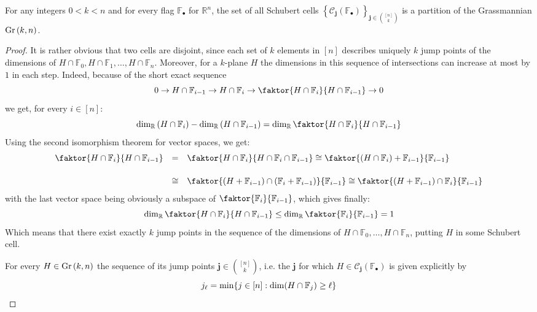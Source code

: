\begin{lemma}\label{lem:jump_pts} For any integers $0<k<n$ and for every flag $\mathbb{F}_{\bullet}$ for $\mathbb{R}^n$, the set of all Schubert cells ${\left\{\mathcal{C}_{\mathbf{j}}(\mathbb{F}_{\bullet})\right\}}_{\mathbf{j}\in\binom{[n]}{k}}$ is a partition of the Grassmannian $\Gr{k}{n}$.
\end{lemma}
\begin{proof} It is rather obvious that two cells are disjoint, since each set of $k$ elements in $[n]$ describes uniquely $k$ jump points of the dimensions of $H\cap\mathbb{F}_0,H\cap\mathbb{F}_1,\ldots,H\cap\mathbb{F}_n$. Moreover, for a $k$-plane $H$ the dimensions in this sequence of intersections can increase at most by $1$ in each step. Indeed, because of the short exact sequence
\[0\to H\cap\mathbb{F}_{i-1}\to H\cap\mathbb{F}_i\to\faktor{H\cap\mathbb{F}_i}{H\cap\mathbb{F}_{i-1}}\to0\]
we get, for every $i\in[n]$:
\[\dim_{\mathbb{R}}\left(H\cap\mathbb{F}_i\right)-\dim_{\mathbb{R}}\left(H\cap\mathbb{F}_{i-1}\right)=\dim_{\mathbb{R}}\faktor{H\cap\mathbb{F}_i}{H\cap\mathbb{F}_{i-1}}\]
Using the second isomorphism theorem for vector spaces, we get:
\[\begin{array}{>{\displaystyle}r>{\displaystyle}c>{\displaystyle}l}\faktor{H\cap\mathbb{F}_i}{H\cap\mathbb{F}_{i-1}}
&=&\faktor{H\cap\mathbb{F}_i}{H\cap\mathbb{F}_i\cap\mathbb{F}_{i-1}}\cong\faktor{(H\cap\mathbb{F}_i)+\mathbb{F}_{i-1}}{\mathbb{F}_{i-1}}\\[1.5em]
&\cong&\faktor{(H+\mathbb{F}_{i-1})\cap(\mathbb{F}_i+\mathbb{F}_{i-1})}{\mathbb{F}_{i-1}}\cong\faktor{(H+\mathbb{F}_{i-1})\cap\mathbb{F}_i}{\mathbb{F}_{i-1}}\\
\end{array}\]
with the last vector space being obviously a subspace of $\faktor{\mathbb{F}_i}{\mathbb{F}_{i-1}}$, which gives finally:
\[\dim_{\mathbb{R}}\faktor{H\cap\mathbb{F}_i}{H\cap\mathbb{F}_{i-1}}\leq\dim_{\mathbb{R}}\faktor{\mathbb{F}_i}{\mathbb{F}_{i-1}}=1\]
Which means that there exist exactly $k$ jump points in the sequence of the dimensions of $H\cap\mathbb{F}_0,\ldots,H\cap\mathbb{F}_n$, putting $H$ in some Schubert cell.

For every $H\in\Gr{k}{n}$ the sequence of its jump points $\mathbf{j}\in\binom{[n]}{k}$, i.e. the $\mathbf{j}$ for which $H\in\mathcal{C}_{\mathbf{j}}(\mathbb{F}_{\bullet})$ is given explicitly by
\[j_{\ell}=\min\{j\in[n]:\dim(H\cap\mathbb{F}_j)\geq\ell\}\qedhere\]
\end{proof}

